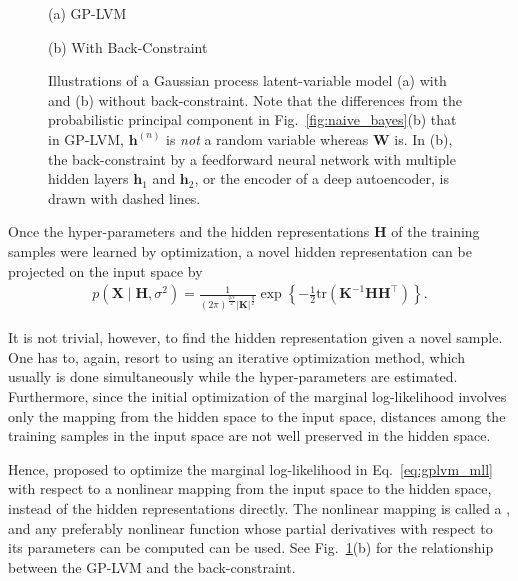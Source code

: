 \documentclass{now}
\newcommand{\vect}[1]{\mathbf{#1}}
\newcommand{\matr}[1]{\mathbf{#1}}
\newcommand{\vh}[0]{\vect{h}}
\newcommand{\mW}[0]{\matr{W}}
\newcommand{\mX}[0]{\matr{X}}
\newcommand{\mK}[0]{\matr{K}}
\newcommand{\mH}[0]{\matr{H}}
\begin{document}
\begin{figure}[t]
    \vspace{2mm}
    \begin{minipage}{0.48\textwidth}
        \centering
        \small
        (a) GP-LVM
    \end{minipage}
    \begin{minipage}{0.48\textwidth}
        \centering
        \small
        (b) With Back-Constraint
    \end{minipage}
    \caption{Illustrations of a Gaussian process
    latent-variable model (a) with and (b) without
    back-constraint. Note that the differences from the
    probabilistic principal component in
    Fig.~\ref{fig:naive_bayes}(b) that in GP-LVM,
    $\vh^{(n)}$ is \textit{not} a random variable whereas
    $\mW$ is. In (b), the back-constraint by a feedforward
    neural network with multiple hidden layers $\vh_1$ and
    $\vh_2$, or the encoder of a deep autoencoder, is drawn
    with dashed lines.}
    \label{fig:gplvm}
\end{figure}

Once the hyper-parameters and the hidden representations $\mH$ of
the training samples were learned by optimization, a novel hidden
representation can be projected on the input space by 
\begin{align*}
    p(\mX \mid \mH, \sigma^2) = \frac{1}{(2\pi)^{\frac{qN}{2}}
    \left| \mK \right|^{\frac{q}{2}}} \exp \left\{
    -\frac{1}{2} \text{tr} (\mK^{-1} \mH \mH^\top) \right\}.
\end{align*}

It is not trivial, however, to find the hidden representation
given a novel sample. One has to, again, resort to using an
iterative optimization method, which usually is done
simultaneously while the hyper-parameters are estimated.
Furthermore, since the initial optimization of the marginal
log-likelihood involves only the mapping from the hidden
space to the input space, distances among the training
samples in the input space are not well preserved in the
hidden space.

Hence, \citet{Lawrence2006} proposed to optimize the
marginal log-likelihood in Eq.~\eqref{eq:gplvm_mll} with
respect to a nonlinear mapping from the input space to the
hidden space, instead of the hidden representations
directly. The nonlinear mapping is called a
, and any preferably nonlinear
function whose partial derivatives with respect to its
parameters can be computed can be used. See
Fig.~\ref{fig:gplvm}(b) for the relationship between the
GP-LVM and the back-constraint.
\end{document}
